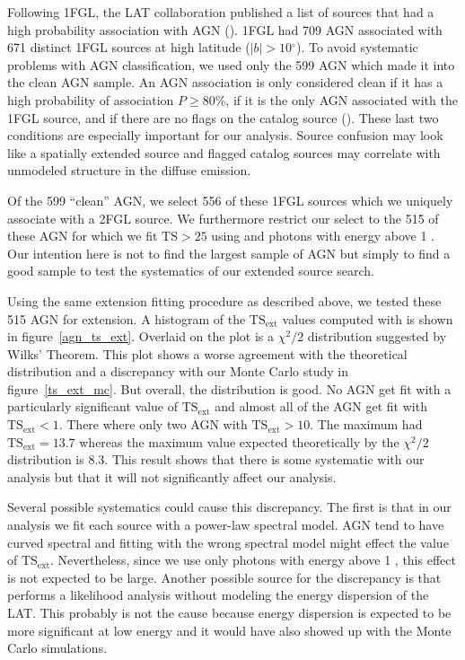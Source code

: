 \documentclass[12pt,preprint]{aastex}
\newcommand{\gev}{\text{GeV}\xspace}
\newcommand{\tsext}{{\ensuremath{\text{TS}_\text{ext}}}\xspace}
\newcommand{\ts}{\text{TS}\xspace}
\renewcommand{\deg}{\ensuremath{^\circ}\xspace}
\newcommand{\pointlike}{\text{\em pointlike}\xspace}
\begin{document}
Following 1FGL, the LAT collaboration published
a list of sources that had a high probability association with
AGN (\cite{first_agn_cat}).
1FGL had 709 AGN associated with 671 distinct
1FGL sources at high latitude ($|b|>10\deg$).  To avoid systematic
problems with AGN classification, we used only the 599 AGN which made
it into the clean AGN sample.  An AGN association is only considered
clean if it has a high probability of association $P\ge 80\%$, if it is
the only AGN associated with the 1FGL source, and if there are no flags
on the catalog source (\cite{first_cat}). These last two conditions are
especially important for our analysis.  Source confusion may look like
a spatially extended source and flagged catalog sources may correlate
with unmodeled structure in the diffuse emission.

Of the 599 ``clean'' AGN, we select 556 of these 1FGL sources which
we uniquely associate with a 2FGL source. We furthermore
restrict our select to the 515 of these AGN for which we fit $\ts>25$
using \pointlike and photons with energy above 1 \gev.  Our intention
here is not to find the largest sample of AGN but simply
to find a good sample to test the systematics of our extended source
search.

Using the same extension fitting procedure as described above, we tested
these 515 AGN for extension. A histogram of the \tsext values computed
with \pointlike is shown in figure~\ref{agn_ts_ext}. Overlaid on the plot
is a $\chi^2/2$ distribution suggested by Wilks' Theorem.  This plot
shows a worse agreement with the theoretical distribution and
a discrepancy with 
our Monte Carlo study in figure~\ref{ts_ext_mc}.  But overall, the
distribution is good. No AGN get fit with a particularly significant
value of $\tsext$ and almost all of the AGN get fit with $\tsext<1$.
There where only two AGN with $\tsext>10$. The maximum had $\tsext=13.7$
whereas the maximum value expected theoretically by the $\chi^2/2$ distribution is
8.3. This result shows that there is some systematic with our
analysis but that it will not significantly affect our analysis.

Several possible systematics could cause this discrepancy. The first is
that in our analysis we fit each source with a power-law spectral model.
AGN tend to have curved spectral and fitting with the wrong spectral
model might effect the value of \tsext. Nevertheless, since we use only
photons with energy above 1 \gev, this effect is not expected to be large.
Another possible source for the discrepancy is that \pointlike performs
a likelihood analysis without modeling the energy dispersion of the LAT.
This probably is not the cause because energy dispersion is expected to
be more significant at low energy and it would have also showed up with
the Monte Carlo simulations.
\end{document}
